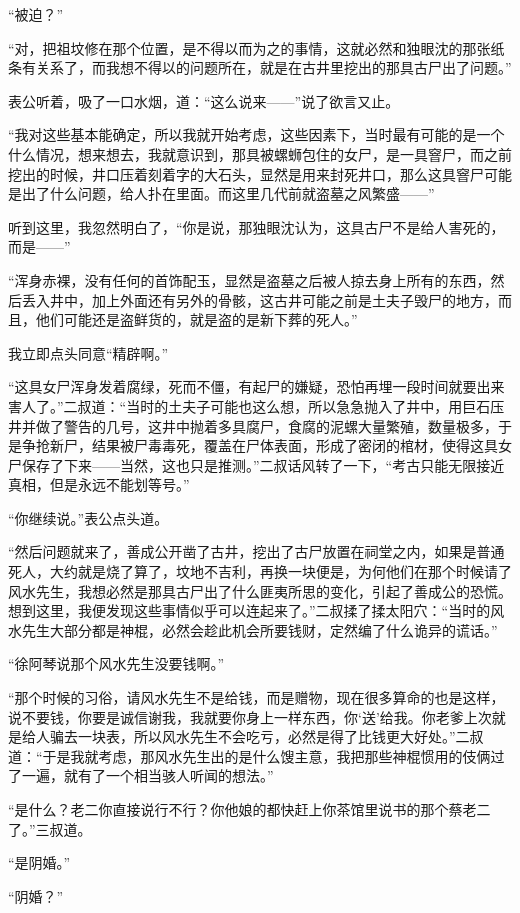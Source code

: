 “被迫？”

“对，把祖坟修在那个位置，是不得以而为之的事情，这就必然和独眼沈的那张纸条有关系了，而我想不得以的问题所在，就是在古井里挖出的那具古尸出了问题。”

表公听着，吸了一口水烟，道：“这么说来——”说了欲言又止。

“我对这些基本能确定，所以我就开始考虑，这些因素下，当时最有可能的是一个什么情况，想来想去，我就意识到，那具被螺蛳包住的女尸，是一具窨尸，而之前挖出的时候，井口压着刻着字的大石头，显然是用来封死井口，那么这具窨尸可能是出了什么问题，给人扑在里面。而这里几代前就盗墓之风繁盛——”

听到这里，我忽然明白了，“你是说，那独眼沈认为，这具古尸不是给人害死的，而是——”

“浑身赤裸，没有任何的首饰配玉，显然是盗墓之后被人掠去身上所有的东西，然后丢入井中，加上外面还有另外的骨骸，这古井可能之前是土夫子毁尸的地方，而且，他们可能还是盗鲜货的，就是盗的是新下葬的死人。”

我立即点头同意“精辟啊。”

“这具女尸浑身发着腐绿，死而不僵，有起尸的嫌疑，恐怕再埋一段时间就要出来害人了。”二叔道：“当时的土夫子可能也这么想，所以急急抛入了井中，用巨石压井并做了警告的几号，这井中抛着多具腐尸，食腐的泥螺大量繁殖，数量极多，于是争抢新尸，结果被尸毒毒死，覆盖在尸体表面，形成了密闭的棺材，使得这具女尸保存了下来——当然，这也只是推测。”二叔话风转了一下，“考古只能无限接近真相，但是永远不能划等号。”

“你继续说。”表公点头道。

“然后问题就来了，善成公开凿了古井，挖出了古尸放置在祠堂之内，如果是普通死人，大约就是烧了算了，坟地不吉利，再换一块便是，为何他们在那个时候请了风水先生，我想必然是那具古尸出了什么匪夷所思的变化，引起了善成公的恐慌。想到这里，我便发现这些事情似乎可以连起来了。”二叔揉了揉太阳穴：“当时的风水先生大部分都是神棍，必然会趁此机会所要钱财，定然编了什么诡异的谎话。”

“徐阿琴说那个风水先生没要钱啊。”

“那个时候的习俗，请风水先生不是给钱，而是赠物，现在很多算命的也是这样，说不要钱，你要是诚信谢我，我就要你身上一样东西，你‘送’给我。你老爹上次就是给人骗去一块表，所以风水先生不会吃亏，必然是得了比钱更大好处。”二叔道：“于是我就考虑，那风水先生出的是什么馊主意，我把那些神棍惯用的伎俩过了一遍，就有了一个相当骇人听闻的想法。”

“是什么？老二你直接说行不行？你他娘的都快赶上你茶馆里说书的那个蔡老二了。”三叔道。

“是阴婚。”

“阴婚？”

